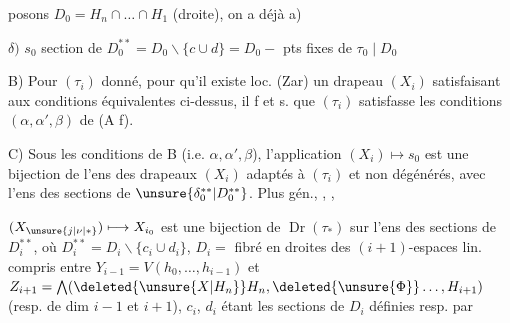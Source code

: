 
\deleted{\unsure{$\gamma)$}} posons  $D_0=H_n\cap\ldots\cap H_1$ (droite), on a déjà a)   

$\delta)$ $s_0$ section de  $D_0^{**}=D_0\smallsetminus\{c\cup d\}=D_0-$ pts fixes de $\tau_0\mid D_0$

B) Pour $(\tau_i)$ donné, pour qu'il existe loc. (Zar) un drapeau $(X_i)$ satisfaisant aux conditions équivalentes ci-dessus, il f et s. que $(\tau_i)$ satisfasse les conditions $(\alpha,\alpha',\beta)$ de (A f).

C) Sous les conditions de B (i.e. $\alpha,\alpha',\beta$), l'application $(X_i)\longmapsto s_0$ est une bijection de l'ens  des drapeaux $(X_i)$ adaptés à $(\tau_i)$ et non dégénérés, avec l'ens des sections de $\unsure{\delta_0^{**}|D_0^{**}}$. Plus gén., , ,

 $(X_{\unsure{j|\nu|*}})\longmapsto X_{i_0}$ est une bijection de $\operatorname{Dr}(\tau_*)$ sur l'ens des sections de $D_i^{**}$, où $D_i^{**}=D_i\smallsetminus\{c_i\cup d_i\}$, $D_i=$ fibré en droites des $(i+1)$-espaces lin. compris entre $Y_{i-1}=V(h_0,\ldots,h_{i-1})$ et $Z_{i+1}=\bigwedge(\deleted{\unsure{X|H_n}}H_n,\deleted{\unsure{\Phi}}\ldots,H_{i+1})$ (resp. de dim $i-1$ et $i+1$), $c_i$, $d_i$ étant les sections de $D_i$ définies resp. par


